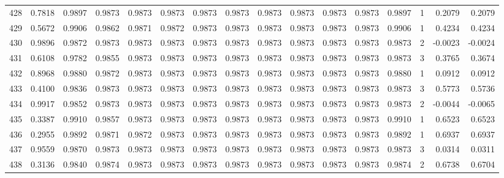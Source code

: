 \begin{tabular}{lrrrrrrrrrrrrrrr}
428 &      0.7818 &  0.9897 &  0.9873 &  0.9873 &  0.9873 &  0.9873 &  0.9873 &  0.9873 &  0.9873 &  0.9873 &   0.9873 &     0.9897 &      1 &                    0.2079 &                     0.2079 \\
429 &      0.5672 &  0.9906 &  0.9862 &  0.9871 &  0.9872 &  0.9873 &  0.9873 &  0.9873 &  0.9873 &  0.9873 &   0.9873 &     0.9906 &      1 &                    0.4234 &                     0.4234 \\
430 &      0.9896 &  0.9872 &  0.9873 &  0.9873 &  0.9873 &  0.9873 &  0.9873 &  0.9873 &  0.9873 &  0.9873 &   0.9873 &     0.9873 &      2 &                   -0.0023 &                    -0.0024 \\
431 &      0.6108 &  0.9782 &  0.9855 &  0.9873 &  0.9873 &  0.9873 &  0.9873 &  0.9873 &  0.9873 &  0.9873 &   0.9873 &     0.9873 &      3 &                    0.3765 &                     0.3674 \\
432 &      0.8968 &  0.9880 &  0.9872 &  0.9873 &  0.9873 &  0.9873 &  0.9873 &  0.9873 &  0.9873 &  0.9873 &   0.9873 &     0.9880 &      1 &                    0.0912 &                     0.0912 \\
433 &      0.4100 &  0.9836 &  0.9873 &  0.9873 &  0.9873 &  0.9873 &  0.9873 &  0.9873 &  0.9873 &  0.9873 &   0.9873 &     0.9873 &      3 &                    0.5773 &                     0.5736 \\
434 &      0.9917 &  0.9852 &  0.9873 &  0.9873 &  0.9873 &  0.9873 &  0.9873 &  0.9873 &  0.9873 &  0.9873 &   0.9873 &     0.9873 &      2 &                   -0.0044 &                    -0.0065 \\
435 &      0.3387 &  0.9910 &  0.9857 &  0.9873 &  0.9873 &  0.9873 &  0.9873 &  0.9873 &  0.9873 &  0.9873 &   0.9873 &     0.9910 &      1 &                    0.6523 &                     0.6523 \\
436 &      0.2955 &  0.9892 &  0.9871 &  0.9872 &  0.9873 &  0.9873 &  0.9873 &  0.9873 &  0.9873 &  0.9873 &   0.9873 &     0.9892 &      1 &                    0.6937 &                     0.6937 \\
437 &      0.9559 &  0.9870 &  0.9873 &  0.9873 &  0.9873 &  0.9873 &  0.9873 &  0.9873 &  0.9873 &  0.9873 &   0.9873 &     0.9873 &      3 &                    0.0314 &                     0.0311 \\
438 &      0.3136 &  0.9840 &  0.9874 &  0.9873 &  0.9873 &  0.9873 &  0.9873 &  0.9873 &  0.9873 &  0.9873 &   0.9873 &     0.9874 &      2 &                    0.6738 &                     0.6704 \\

\end{tabular}
